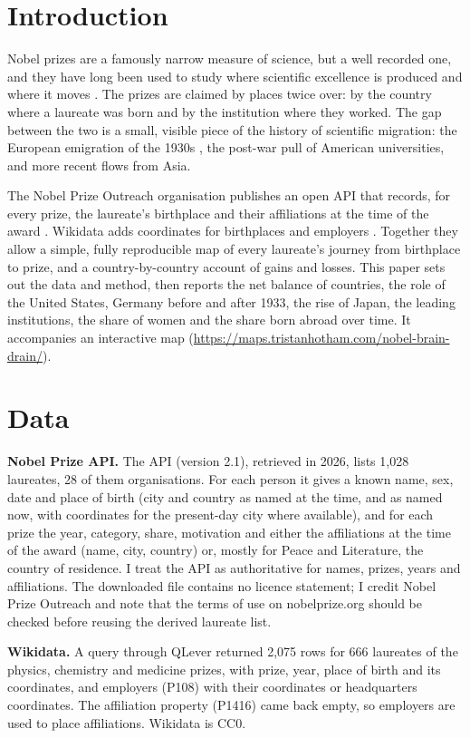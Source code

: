 \documentclass[11pt,a4paper]{article}
\begin{document}
\section{Introduction}
Nobel prizes are a famously narrow measure of science, but a well recorded one, and they have long been used to study where scientific excellence is produced and where it moves \citep{zuckerman,schlagberger}. The prizes are claimed by places twice over: by the country where a laureate was born and by the institution where they worked. The gap between the two is a small, visible piece of the history of scientific migration: the European emigration of the 1930s \citep{medawar}, the post-war pull of American universities, and more recent flows from Asia.

The Nobel Prize Outreach organisation publishes an open API that records, for every prize, the laureate's birthplace and their affiliations at the time of the award \citep{nobelapi}. Wikidata adds coordinates for birthplaces and employers \citep{wikidata}. Together they allow a simple, fully reproducible map of every laureate's journey from birthplace to prize, and a country-by-country account of gains and losses. This paper sets out the data and method, then reports the net balance of countries, the role of the United States, Germany before and after 1933, the rise of Japan, the leading institutions, the share of women and the share born abroad over time. It accompanies an interactive map (\url{https://maps.tristanhotham.com/nobel-brain-drain/}).

\section{Data}
\textbf{Nobel Prize API.} The API (version 2.1), retrieved in 2026, lists 1,028 laureates, 28 of them organisations. For each person it gives a known name, sex, date and place of birth (city and country as named at the time, and as named now, with coordinates for the present-day city where available), and for each prize the year, category, share, motivation and either the affiliations at the time of the award (name, city, country) or, mostly for Peace and Literature, the country of residence. I treat the API as authoritative for names, prizes, years and affiliations. The downloaded file contains no licence statement; I credit Nobel Prize Outreach and note that the terms of use on nobelprize.org should be checked before reusing the derived laureate list.

\textbf{Wikidata.} A query through QLever \citep{qlever} returned 2,075 rows for 666 laureates of the physics, chemistry and medicine prizes, with prize, year, place of birth and its coordinates, and employers (P108) with their coordinates or headquarters coordinates. The affiliation property (P1416) came back empty, so employers are used to place affiliations. Wikidata is CC0.
\end{document}
